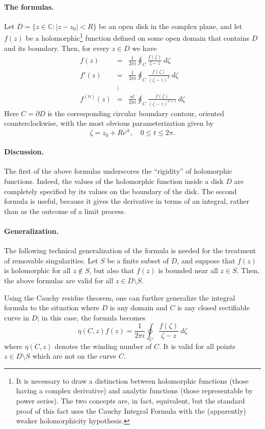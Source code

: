 \documentclass{article}
\begin{document}
\paragraph{The formulas.}
Let $D=\{z\in\mathbb{C} : |z-z_0| <R\}$ be an open disk in the
complex plane, and let $f(z)$ be a holomorphic\footnote{It is
  necessary to draw a distinction between holomorphic functions (those having
  a complex derivative) and analytic functions (those representable by
  power series).  The two concepts are, in fact, equivalent, but
  the standard proof of this fact uses the Cauchy Integral Formula
  with the (apparently) weaker holomorphicity hypothesis.} function
defined on some open domain that contains $D$ and its boundary.  Then,
for every $z\in D$ we have
\begin{eqnarray*}
f(z) &=& \frac{1}{2 \pi i} \oint_C \frac{f(\zeta)}{\zeta-z}\ d\zeta \\
f'(z) &=& \frac{1}{2 \pi i} \oint_C \frac{f(\zeta)}{(\zeta-z)^2}\ d\zeta \\
& \vdots & \\
f^{(n)}(z) &=& \frac{n!}{2 \pi i} \oint_C \frac{f(\zeta)}{(\zeta-z)^{n+1}}\ d\zeta  
\end{eqnarray*}
Here $C=\partial D$ is the corresponding circular boundary contour,
oriented counterclockwise, with the most obvious parameterization
given by
$$\zeta=z_0+R e^{it},\quad 0\leq t\leq 2\pi.$$

\paragraph{Discussion.}
The first of the above formulas underscores the ``rigidity'' of
holomorphic functions.  Indeed, the values of the holomorphic function
inside a disk $D$ are completely specified by its values on the
boundary of the disk.  The second formula is useful, because it gives
the derivative in terms of an integral, rather than as the outcome of
a limit process.

\paragraph{Generalization.}
The following technical generalization of the formula is needed for
the treatment of removable singularities.  Let $S$ be a finite subset
of $D$, and suppose that  $f(z)$ is holomorphic for all $z\notin
 S$, but also that
$f(z)$ is bounded near all $z\in S$.  Then, the
above formulas are valid for all $z\in D\setminus S$.

Using the Cauchy residue theorem, one can further generalize the integral formula to the situation where $D$ is any domain and $C$ is any closed rectifiable curve in $D$; in this case, the formula becomes
$$
\eta(C,z) f(z) = \frac{1}{2 \pi i} \oint_C \frac{f(\zeta)}{\zeta-z}\ d\zeta
$$
where $\eta(C,z)$ denotes the winding number of $C$. It is valid for all points $z \in D \setminus S$ which are not on the curve $C$.
\end{document}
